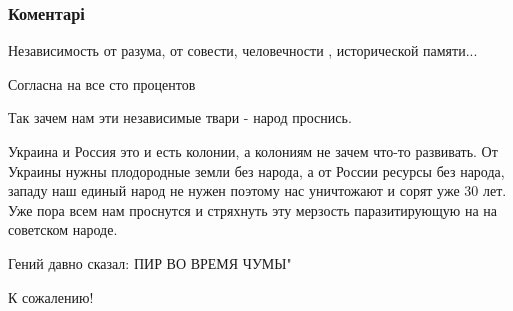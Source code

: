 \subsubsection{Коментарі}

\begin{itemize}
 
Независимость от разума, от совести, человечности , исторической памяти...

 
Согласна на все сто процентов

 
Так зачем нам эти независимые твари - народ проснись.

 

Украина и Россия это и есть колонии, а колониям не зачем что-то развивать. От
Украины нужны плодородные земли без народа, а от России ресурсы без
народа, западу наш единый народ не нужен поэтому нас уничтожают и сорят уже 30
лет. Уже пора всем нам проснутся и стряхнуть эту мерзость паразитирующую на на
советском народе.

 
Гений давно сказал: ПИР ВО ВРЕМЯ ЧУМЫ"

 
К сожалению!

\end{itemize}

